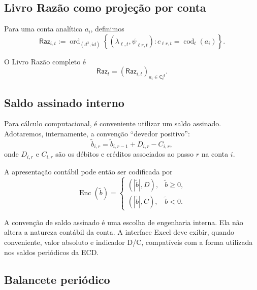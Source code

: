 \documentclass[11pt,a4paper]{article}
\newcommand{\Raz}{\mathsf{Raz}}
\newcommand{\cod}{\operatorname{cod}}
\newcommand{\ordena}{\operatorname{ord}}
\newcommand{\Enc}{\operatorname{Enc}}
\begin{document}
\subsection{Livro Razão como projeção por conta}

Para uma conta analítica $a_i$, definimos
\begin{equation}
\boxed{
\Raz_{i,t}
:=
\ordena_{(d^\lambda,id)}
\left\{
(\lambda_{\ell,t},\psi_{\ell r,t}):
 c_{\ell r,t}=\cod_t(a_i)
\right\}.
}
\label{eq:ledger-account}
\end{equation}

O Livro Razão completo é
\begin{equation}
\boxed{
\Raz_t=(\Raz_{i,t})_{a_i\in\mathsf C_t^{A}}.
}
\end{equation}

\subsection{Saldo assinado interno}

Para cálculo computacional, é conveniente utilizar um saldo assinado. Adotaremos, internamente, a convenção ``devedor positivo'':
\begin{equation}
\boxed{
\widetilde b_{i,r}
=
\widetilde b_{i,r-1}
+
D_{i,r}-C_{i,r},
}
\label{eq:signed-balance}
\end{equation}
onde $D_{i,r}$ e $C_{i,r}$ são os débitos e créditos associados ao passo $r$ na conta $i$.

A apresentação contábil pode então ser codificada por
\begin{equation}
\boxed{
\Enc(\widetilde b)=
\begin{cases}
(|\widetilde b|,D),&\widetilde b\ge 0,\\
(|\widetilde b|,C),&\widetilde b<0.
\end{cases}
}
\label{eq:balance-encoding}
\end{equation}

\begin{cuidado}
A convenção de saldo assinado é uma escolha de engenharia interna. Ela não altera a natureza contábil da conta. A interface Excel deve exibir, quando conveniente, valor absoluto e indicador D/C, compatíveis com a forma utilizada nos saldos periódicos da ECD.
\end{cuidado}

\subsection{Balancete periódico}
\end{document}
